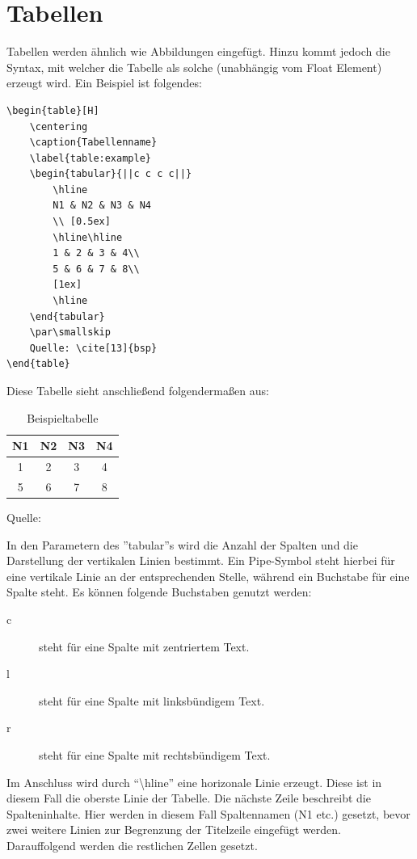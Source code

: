 \section{Tabellen}
Tabellen werden ähnlich wie Abbildungen eingefügt. Hinzu kommt jedoch die Syntax, mit welcher die Tabelle als solche (unabhängig vom Float Element) erzeugt wird. Ein Beispiel ist folgendes:
\begin{lstlisting}
\begin{table}[H]
	\centering
	\caption{Tabellenname}
	\label{table:example}
	\begin{tabular}{||c c c c||}
		\hline
		N1 & N2 & N3 & N4
		\\ [0.5ex]
		\hline\hline
		1 & 2 & 3 & 4\\
		5 & 6 & 7 & 8\\
		[1ex]
		\hline
	\end{tabular}
	\par\smallskip 
	Quelle: \cite[13]{bsp}
\end{table}
\end{lstlisting}

Diese Tabelle sieht anschließend folgendermaßen aus:
\begin{table}[H]
	\centering
	\caption{Beispieltabelle}
	\label{table:example}
	\begin{tabular}{||c c c c||}
		\hline
		N1 & N2 & N3 & N4
		\\ [0.5ex]
		\hline\hline
		1 & 2 & 3 & 4\\
		5 & 6 & 7 & 8\\
		[1ex]
		\hline
	\end{tabular}
	\par\smallskip 
	Quelle: \cite[13]{bsp}
\end{table}
In den Parametern des ''tabular''s wird die Anzahl der Spalten und die Darstellung der vertikalen Linien bestimmt. Ein Pipe-Symbol steht hierbei für eine vertikale Linie an der entsprechenden Stelle, während ein Buchstabe für eine Spalte steht. Es können folgende Buchstaben genutzt werden:
\begin{description}
	\item[c] steht für eine Spalte mit zentriertem Text.
	\item[l] steht für eine Spalte mit linksbündigem Text.
	\item[r] steht für eine Spalte mit rechtsbündigem Text.
\end{description}

Im Anschluss wird durch \enquote{\textbackslash hline} eine horizonale Linie erzeugt. Diese ist in diesem Fall die oberste Linie der Tabelle. Die nächste Zeile beschreibt die Spalteninhalte. Hier werden in diesem Fall Spaltennamen (N1 etc.) gesetzt, bevor zwei weitere Linien zur Begrenzung der Titelzeile eingefügt werden. Darauffolgend werden die restlichen Zellen gesetzt.